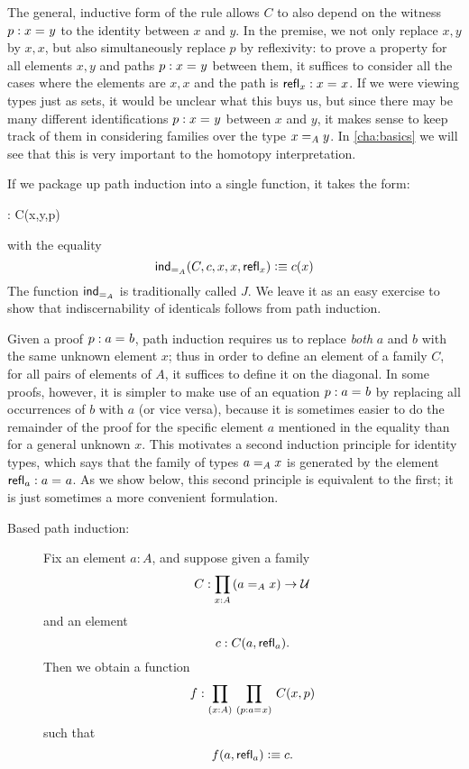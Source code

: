 The general, inductive form of the rule allows $C$ to also depend on the witness $p:\id{x}{y}$ to the identity between $x$ and $y$.  In the premise, we not only replace $x, y$ by $x,x$, but also simultaneously replace $p$ by reflexivity: to prove a property for all elements $x,y$ and paths $p : \id{x}{y}$ between them, it suffices to consider all the cases where the elements are $x,x$ and the path is $\refl{x}: \id{x}{x}$.  If we were viewing types just as sets, it would be unclear what this buys us, but since there may be many different identifications $p : \id{x}{y}$ between $x$ and $y$, it makes sense to keep track of them in considering families over the type $\id[A]{x}{y}$.
In \autoref{cha:basics} we will see that this is very important to the homotopy interpretation.

If we package up path induction into a single function, it takes the form:
%
\begin{narrowmultline*}
   :  
   \to 
  \narrowbreak
     C(x,y,p)
\end{narrowmultline*}
with the equality
\[ \indid{A}(C,c,x,x,\refl{x}) \defeq c(x) \]
The function $ \indid{A}$ is traditionally called $J$.  We leave it as an easy exercise to show that indiscernability of identicals follows from path induction.  

\mentalpause

Given a proof $p : \id{a}{b}$,
path induction requires us to replace \emph{both} $a$ and $b$ with the same unknown element $x$; thus in order to define an element of a family
$C$, for all pairs of elements of $A$, it suffices to define it on the diagonal.
In some proofs, however, it is simpler to make use of an equation $p : \id{a}{b}$ by replacing all occurrences of $b$ with $a$ (or vice versa), because it is sometimes easier to do the remainder of the proof for the specific element $a$ mentioned in the equality than for a general unknown $x$.  This motivates a second induction principle for identity types, which says that the family of types $\id[A]{a}{x}$ is generated by the element $\refl{a} : \id{a}{a}$.  As we show below, this second principle is equivalent to the first; it is just sometimes a more convenient formulation.

%
%
\begin{description}
\item[Based path induction:] 
  Fix an element $a:A$, and suppose given a family
  \[ C : \prd{x:A} (\id[A]{a}{x}) \to \UU \]
  and an element
  \[ c : C(a,\refl{a}). \]
  Then we obtain a function
  \[ f : \prd{x:A}{p:\id{a}{x}} C(x,p) \]
  such that
  \[ f(a,\refl{a}) \defeq c .\]
\end{description}


